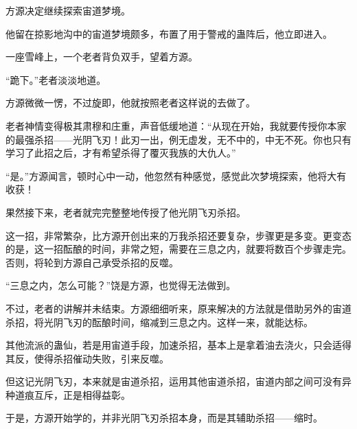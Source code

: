\begin{this_body}
方源决定继续探索宙道梦境。

他留在掠影地沟中的宙道梦境颇多，布置了用于警戒的蛊阵后，他立即进入。

一座雪峰上，一个老者背负双手，望着方源。

“跪下。”老者淡淡地道。

方源微微一愣，不过旋即，他就按照老者这样说的去做了。

老者神情变得极其肃穆和庄重，声音低缓地道：“从现在开始，我就要传授你本家的最强杀招——光阴飞刃！此刃一出，例无虚发，无不中的，中无不死。你也只有学习了此招之后，才有希望杀得了覆灭我族的大仇人。”

“是。”方源闻言，顿时心中一动，他忽然有种感觉，感觉此次梦境探索，他将大有收获！

果然接下来，老者就完完整整地传授了他光阴飞刃杀招。

这一招，非常繁杂，比方源开创出来的万我杀招还要复杂，步骤更是多变。更变态的是，这一招酝酿的时间，非常之短，需要在三息之内，就要将数百个步骤走完。否则，将轮到方源自己承受杀招的反噬。

“三息之内，怎么可能？”饶是方源，也觉得无法做到。

不过，老者的讲解并未结束。方源细细听来，原来解决的方法就是借助另外的宙道杀招，将光阴飞刃的酝酿时间，缩减到三息之内。这样一来，就能达标。

其他流派的蛊仙，若是用宙道手段，加速杀招，基本上是拿着油去浇火，只会适得其反，使得杀招催动失败，引来反噬。

但这记光阴飞刃，本来就是宙道杀招，运用其他宙道杀招，宙道内部之间可没有异种道痕互斥，正是相得益彰。

于是，方源开始学的，并非光阴飞刃杀招本身，而是其辅助杀招——缩时。

\end{this_body}

